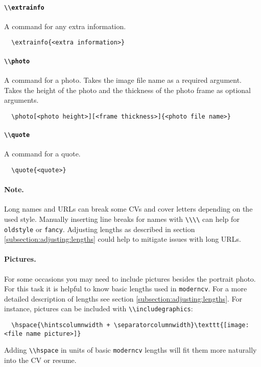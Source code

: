 \documentclass[a4paper, 11pt]{article}
\newcommand{\note}{\paragraph{Note.}}
\newcommand{\code}[1]{\lstinline!#1!}
\newcommand{\moderncv}{\code{moderncv}}
\begin{document}
\paragraph{\code{\\extrainfo}}
A command for any extra information.
\begin{lstlisting}
  \extrainfo{<extra information>}
\end{lstlisting}

\paragraph{\code{\\photo}}
A command for a photo.
Takes the image file name as a required argument.
Takes the height of the photo and the thickness of the photo frame as optional arguments.
\begin{lstlisting}
  \photo[<photo height>][<frame thickness>]{<photo file name>}
\end{lstlisting}

\paragraph{\code{\\quote}}
A command for a quote.
\begin{lstlisting}
  \quote{<quote>}
\end{lstlisting}

\note{Long names and URLs can break some CVs and cover letters depending on the used style. Manually inserting line breaks for names with \code{\\\\} can help for \texttt{oldstyle} or \texttt{fancy}. Adjusting lengths as described in section \ref{subsection:adjusting:lengths} could help to mitigate issues with long URLs.}

\paragraph{Pictures.}
For some occasions you may need to include pictures besides the portrait photo. For this task it is helpful to know basic lengths used in \moderncv. For a more detailed description of lengths see section \ref{subsection:adjusting:lengths}.
For instance, pictures can be included with \code{\\includegraphics}:
\begin{lstlisting}
  \hspace{\hintscolumnwidth + \separatorcolumnwidth}\texttt{[image: <file name picture>]}
\end{lstlisting}
Adding \code{\\hspace} in units of basic \code{moderncv} lengths will fit them more naturally into the CV or resume.  
\end{document}

